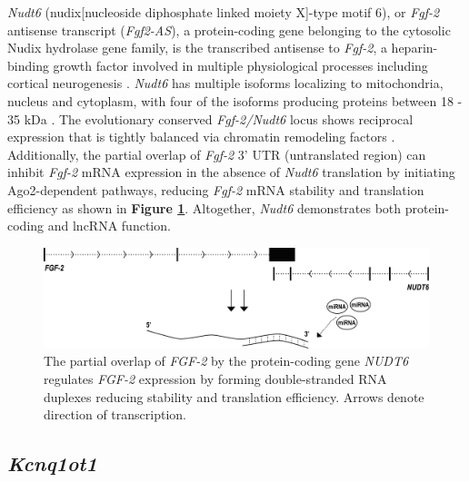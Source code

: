 {\textit{Nudt6} (nudix[nucleoside diphosphate linked moiety X]-type motif 6), or \textit{Fgf-2} antisense transcript (\textit{Fgf2-AS}), a protein-coding gene belonging to the cytosolic Nudix hydrolase gene family, is the transcribed antisense to \textit{Fgf-2}, a heparin-binding growth factor involved in multiple physiological processes including cortical neurogenesis \cite{Tiberi2012}. \textit{Nudt6} has multiple isoforms localizing to mitochondria, nucleus and cytoplasm, with four of the isoforms producing proteins between 18 - 35 kDa \cite{Zhang2007}. The evolutionary conserved \textit{Fgf-2/Nudt6} locus shows reciprocal expression that is tightly balanced via chromatin remodeling factors \cite{Knee1997,McEachern2014}. Additionally, the partial overlap of \textit{Fgf-2} 3' UTR (untranslated region) can inhibit \textit{Fgf-2} mRNA expression in the absence of \textit{Nudt6} translation by initiating Ago2-dependent pathways, reducing \textit{Fgf-2} mRNA stability and translation efficiency \cite{MacFarlane2010} as shown in \textbf{Figure \ref{Figure 1-8: }}. Altogether, \textit{Nudt6} demonstrates both protein-coding and lncRNA function.

\begin{figure}[!ht]
\centering
\includegraphics[scale=0.45]{figures/NUDT6.pdf}
\caption{The partial overlap of \emph{FGF-2} by the protein-coding gene \emph{NUDT6} regulates \emph{FGF-2} expression by forming double-stranded RNA duplexes reducing stability and translation efficiency. Arrows denote direction of transcription.}
\label{Figure 1-8: }
\end{figure}

\subsection{\textit{Kcnq1ot1}}

}

